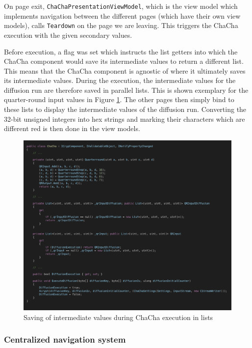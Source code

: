 On page exit, \texttt{ChaChaPresentationViewModel}, which is the view model which implements navigation between the different pages (which have their own view models), calls \texttt{Teardown} on the page we are leaving. This triggers the ChaCha execution with the given secondary values.

Before execution, a flag was set which instructs the list getters into which the ChaCha component would save its intermediate values to return a different list. This means that the ChaCha component is agnostic of where it ultimately saves its intermediate values. During the execution, the intermediate values for the diffusion run are therefore saved in parallel lists. This is shown exemplary for the quarter-round input values in Figure \ref{fig:mvvm.chacha}. The other pages then simply bind to these lists to display the intermediate values of the diffusion run. Converting the 32-bit unsigned integers into hex strings and marking their characters which are different red is then done in the view models.

\begin{figure}
\centering
\includegraphics[width=\textwidth]{figures/code/mvvm-arch/chacha.png}
\caption[Intermediate values saving]{Saving of intermediate values during ChaCha execution in lists}
\label{fig:mvvm.chacha}
\end{figure}

\vfill

\FloatBarrier

\subsubsection{Centralized navigation system}

